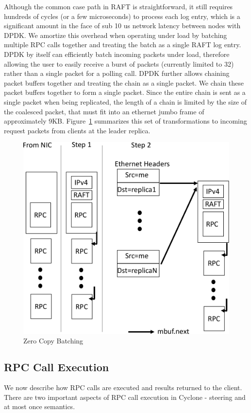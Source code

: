 \documentclass[10pt, preprint]{sigplanconf}
\begin{document}
Although the common case path in RAFT is straightforward, it still requires
hundreds of cycles (or a few microseconds) to process each log entry, which is a
significant amount in the face of sub 10 us network latency between nodes with
DPDK. We amortize this overhead when operating under load by batching multiple
RPC calls together and treating the batch as a single RAFT log entry.  DPDK by
itself can efficiently batch incoming packets under load, therefore allowing the
user to easily receive a burst of packets (currently limited to 32) rather than
a single packet for a polling call.  DPDK further allows chaining packet buffers
together and treating the chain as a single packet. We chain these packet
buffers together to form a single packet. Since the entire chain is sent as a
single packet when being replicated, the length of a chain is limited by the
size of the coalesced packet, that must fit into an ethernet jumbo frame of
approximately 9KB. Figure~\ref{fig:zc_batch} summarizes this set of
transformations to incoming request packets from clients at the leader replica. 

\begin{figure}
\includegraphics[width=0.9\columnwidth]{figures/chain}
\vspace{-0.15in}
\caption{Zero Copy Batching}
\label{fig:zc_batch}
\end{figure}

\subsection{RPC Call Execution}
\label{sec:exec}
We now describe how RPC calls are executed and results returned to the
client. There are two important aspects of RPC call execution in Cyclone -
steering and at most once semantics.
\end{document}
